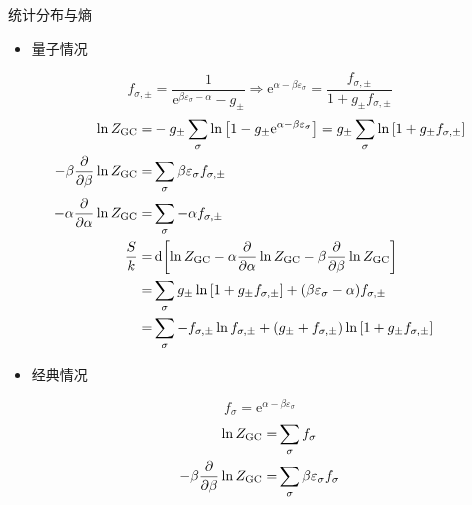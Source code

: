 \begin{framed}
    统计分布与熵
    \begin{itemize}
        \item 量子情况
    \end{itemize} \[
        f_{\sigma, \pm} = \frac{1}{\mathrm{e}^{\beta \varepsilon_{\sigma} - \alpha} - g_{\pm} } \Rightarrow \mathrm{e}^{\alpha - \beta \varepsilon_{\sigma}} = \frac{f_{\sigma, \pm}}{1 + g_{\pm} f_{\sigma, \pm}}
    \] \begin{align*}
        \ln{Z_{\text{GC}}} =                       & - g_{\pm} \sum_{\sigma} \ln \qty[1 - g_{\pm} \mathrm{e}^{\alpha - \beta \varepsilon_{\sigma}}] = g_{\pm} \sum_{\sigma} \ln \qty[1 + g_{\pm} f_{\sigma, \pm}] \\
        - \beta \pdv{\beta} \ln{Z_{\text{GC}}} =   & \sum_{\sigma} \beta \varepsilon_{\sigma} f_{\sigma, \pm}                                                                                                     \\
        - \alpha \pdv{\alpha} \ln{Z_{\text{GC}}} = & \sum_{\sigma} - \alpha f_{\sigma, \pm}                                                                                                                       \\
        \frac{S}{k} =                              & \dd{\qty[\ln{Z_{\text{GC}}} - \alpha \pdv{\alpha} \ln{Z_{\text{GC}}} - \beta \pdv{\beta} \ln{Z_{\text{GC}}}]}                                                \\
        =                                          & \sum_{\sigma} g_{\pm} \ln \qty[1 + g_{\pm} f_{\sigma, \pm}] + (\beta \varepsilon_{\sigma} - \alpha) f_{\sigma, \pm}                                          \\
        =                                          & \sum_{\sigma} - f_{\sigma, \pm} \ln{f_{\sigma, \pm}} + \qty(g_{\pm} + f_{\sigma, \pm}) \ln \qty[ 1 + g_{\pm} f_{\sigma, \pm} ]
    \end{align*}
    \begin{itemize}
        \item 经典情况
    \end{itemize} \[
        f_{\sigma} = \mathrm{e}^{\alpha - \beta \varepsilon_{\sigma}}
    \] \begin{align*}
        \ln{Z_{\text{GC}}} =                       & \sum_{\sigma} f_{\sigma}                                                                                      \\
        - \beta \pdv{\beta} \ln{Z_{\text{GC}}} =   & \sum_{\sigma} \beta \varepsilon_{\sigma} f_{\sigma}                                                           \\

\end{align*}
\end{framed}
